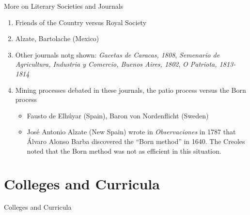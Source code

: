 \documentclass{beamer}
\begin{document}
\begin{frame}{More on Literary Societies and Journals}
\small
\begin{enumerate}
\item Friends of the Country versus Royal Society
\item Alzate, Bartolache (Mexico)
\item Other journals notg shown: \textit{Gacetas de Caracas, 1808}, \textit{Semenario de Agricultura, Industria y Comercio, Buenos Aires, 1802}, \textit{O Patriota, 1813-1814}
\item Mining processes debated in these journals, the patio process versus the Born process
\begin{itemize}
\item Fausto de Elh\'{u}yar (Spain), Baron von Nordenflicht (Sweden)
\item Jos\'{e} Antonio Alzate (New Spain) wrote in \textit{Observaciones} in 1787 that \'{A}lvaro Alonso Barba discovered the ``Born method'' in 1640.  The Creoles noted that the Born method was not as efficient in this situation.
\end{itemize}
\end{enumerate}
\end{frame}

\section{Colleges and Curricula}

\begin{frame}{Colleges and Curricula}

\end{frame}
\end{document}
